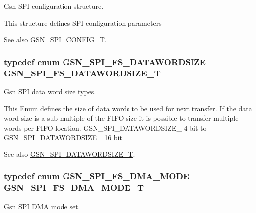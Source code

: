 Gsn SPI configuration structure. 

This structure defines SPI configuration parameters

\begin{DoxySeeAlso}{See also}
\hyperlink{a00655_ga582e2b85ccb404b546fbe5a27f2113cb}{GSN\_\-SPI\_\-CONFIG\_\-T}. 
\end{DoxySeeAlso}
\hypertarget{a00655_gaad2f137ab7bba85003348a4b895e435d}{
\subsubsection[{GSN\_\-SPI\_\-FS\_\-DATAWORDSIZE\_\-T}]{\setlength{\rightskip}{0pt plus 5cm}typedef enum {\bf GSN\_\-SPI\_\-FS\_\-DATAWORDSIZE}  {\bf GSN\_\-SPI\_\-FS\_\-DATAWORDSIZE\_\-T}}}
\label{a00655_gaad2f137ab7bba85003348a4b895e435d}


Gsn SPI data word size types. 

This Enum defines the size of data words to be used for next transfer. If the data word size is a sub-\/multiple of the FIFO size it is possible to transfer multiple words per FIFO location. GSN\_\-SPI\_\-DATAWORDSIZE\_ 4 bit to GSN\_\-SPI\_\-DATAWORDSIZE\_ 16 bit

\begin{DoxySeeAlso}{See also}
\hyperlink{a00655_ga63cbe81427185213bde26b93dde72747}{GSN\_\-SPI\_\-DATAWORDSIZE\_\-T}. 
\end{DoxySeeAlso}
\hypertarget{a00655_ga1348552a2785bfc5647d4b4aa234c64c}{
\subsubsection[{GSN\_\-SPI\_\-FS\_\-DMA\_\-MODE\_\-T}]{\setlength{\rightskip}{0pt plus 5cm}typedef enum {\bf GSN\_\-SPI\_\-FS\_\-DMA\_\-MODE}  {\bf GSN\_\-SPI\_\-FS\_\-DMA\_\-MODE\_\-T}}}
\label{a00655_ga1348552a2785bfc5647d4b4aa234c64c}


Gsn SPI DMA mode set. 

